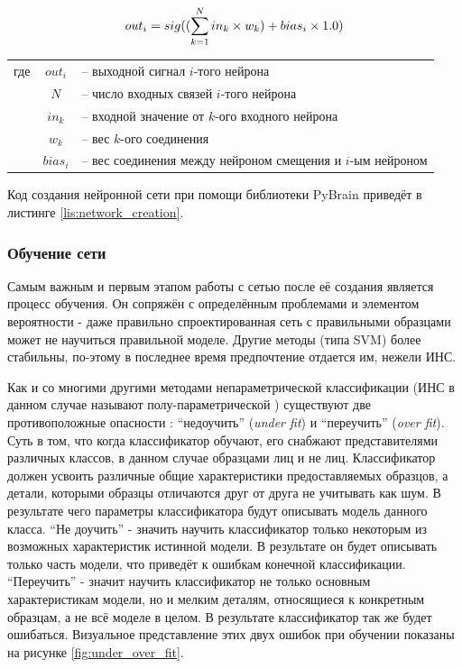 \documentclass[12pt]{report}
\begin{document}
\begin{equation}
\label{eq:bias_calc}
\centering
out_i=sig((\sum_{k=1}^{N}{in_k \times w_k}) + bias_i \times 1.0)
\end{equation}

\begin{tabular}{p{3cm} c l}
где & $out_i$ & -- выходной сигнал $i$-того нейрона\\
	& $N$ & -- число входных связей $i$-того нейрона\\
	& $in_k$ & -- входной значение от $k$-ого входного нейрона\\
	& $w_k$ & -- вес $k$-ого соединения\\
	& $bias_i$ & -- вес соединения между нейроном смещения и $i$-ым нейроном\\
\end{tabular}

Код создания нейронной сети при помощи библиотеки PyBrain приведёт в листинге \ref{lis:network_creation}. 
\lstset{caption=Создание сети со скрытым слоем и без него.,
label=lis:network_creation,
basicstyle=\footnotesize\ttfamily,
captionpos=b,
breaklines=true,
breakatwhitespace=false,
numbers=left,
numbersep=5pt,
language=Python,
}



\subsubsection{Обучение сети}
Самым важным и первым этапом работы с сетью после её создания является процесс обучения. Он сопряжён с определённым 
проблемами и элементом вероятности - даже правильно спроектированная сеть с правильными образцами может не научиться 
правильной моделе. Другие методы (типа SVM) более стабильны, по-этому в последнее время предпочтение отдается им, 
нежели ИНС.

Как и со многими другими методами непараметрической классификации (ИНС в данном случае называют полу-параметрической 
\citep{xu2006color}) существуют две противоположные опасности %
: ``недоучить'' (\textit{under fit}) и ``переучить'' (\textit{over fit}). Суть в том, что когда классификатор 
обучают, его снабжают представителями различных классов, в данном случае образцами лиц и не лиц. Классификатор должен 
усвоить различные общие характеристики предоставляемых образцов, а детали, которыми образцы отличаются друг от друга 
не учитывать как шум. В результате чего параметры классификатора будут описывать модель данного класса. ``Не
доучить'' - значить научить классификатор только некоторым из возможных характеристик истинной модели. В результате 
он будет описывать только часть модели, что приведёт к ошибкам конечной классификации. ``Переучить'' - значит научить 
классификатор не только основным характеристикам модели, но и мелким деталям, относящиеся к конкретным образцам, а не 
всё моделе в целом. В результате классификатор так же будет ошибаться. \citep{bradski2008learning} Визуальное 
представление этих двух ошибок при обучении показаны на рисунке \ref{fig:under_over_fit}.
\end{document}
